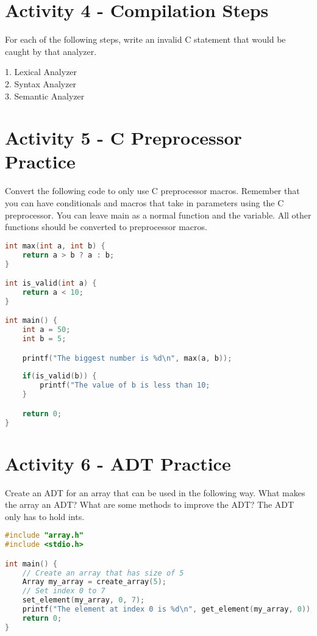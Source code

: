 \documentclass[]{article}
\begin{document}
\section*{Activity 4 - Compilation Steps}
For each of the following steps, write an invalid C statement that would be caught by that
analyzer. \par

1. Lexical Analyzer \\

2. Syntax Analyzer \\

3. Semantic Analyzer \\

\section*{Activity 5 - C Preprocessor Practice}
Convert the following code to only use C preprocessor macros. Remember that you can have
conditionals and macros that take in parameters using the C preprocessor. You can leave main
as a normal function and the variable. All other functions should be converted to preprocessor macros.

\begin{lstlisting}[language=C]
int max(int a, int b) {
    return a > b ? a : b;
}

int is_valid(int a) {
    return a < 10;
}

int main() {
    int a = 50;
    int b = 5;

    printf("The biggest number is %d\n", max(a, b));
    
    if(is_valid(b)) {
        printf("The value of b is less than 10;
    }

    return 0;
}
\end{lstlisting}

\section*{Activity 6 - ADT Practice}
Create an ADT for an array that can be used in the following way. What makes the array an ADT?
What are some methods to improve the ADT? The ADT only has to hold ints.

\begin{lstlisting}[language=C]
#include "array.h"
#include <stdio.h>

int main() {
    // Create an array that has size of 5
    Array my_array = create_array(5);
    // Set index 0 to 7
    set_element(my_array, 0, 7);
    printf("The element at index 0 is %d\n", get_element(my_array, 0));
    return 0;
}
\end{lstlisting}
\end{document}
